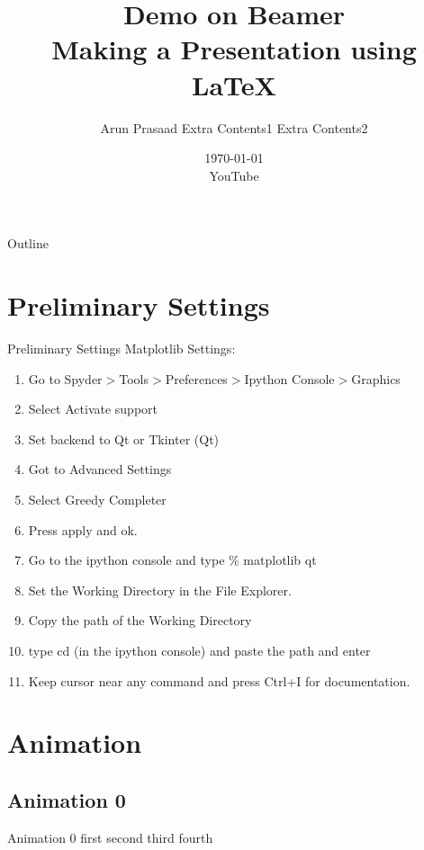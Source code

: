 \documentclass[handout]{beamer} %
\title[Beamer \hspace{5mm} \insertframenumber / \inserttotalframenumber]{Demo on Beamer \\ Making a Presentation using \LaTeX}
\author[Arun, YouTube]{Arun Prasaad Extra Contents1  Extra Contents2}
\date{\today  \\ YouTube}
\begin{document}

\begin{frame}
	\titlepage
\end{frame}

\begin{frame}{Outline} %
	\tableofcontents
\end{frame}


\section{Preliminary Settings}

\begin{frame}{Preliminary Settings}
	Matplotlib Settings:
	\begin{enumerate}
		\item Go to Spyder$>$Tools$>$Preferences$>$Ipython Console$>$Graphics
		\item Select Activate support
		\item {\color{red} Set backend to Qt or Tkinter (Qt)}
		\item Got to Advanced Settings
		\item Select Greedy Completer
		\item Press apply and ok.
		\item Go to the ipython console and type \% matplotlib qt
		\item Set the Working Directory in the File Explorer.
		\item Copy the path of the Working Directory
		\item type cd (in the ipython console) and paste the path and enter
		\item Keep cursor near any command and press Ctrl+I for documentation.
	\end{enumerate}
\end{frame}

\section{Animation}

\subsection{Animation 0}
\begin{frame}{Animation 0}
	first \pause second \pause third \pause fourth
\end{frame}
\end{document}
